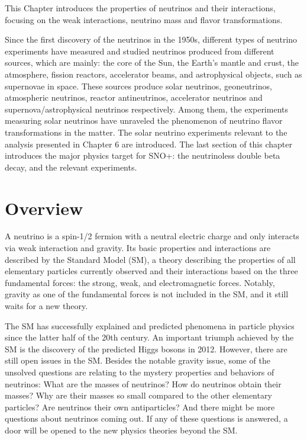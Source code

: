 This Chapter introduces the properties of neutrinos and their interactions, focusing on the weak interactions, neutrino mass and flavor transformations. 

Since the first discovery of the neutrinos in the 1950s, different types of neutrino experiments have measured and studied neutrinos produced from different sources, which are mainly: the core of the Sun, the Earth's mantle and crust, the atmosphere, fission reactors, accelerator beams, and astrophysical objects, such as supernovae in space. These sources produce solar neutrinos, geoneutrinos, atmospheric neutrinos, reactor antineutrinos, accelerator neutrinos and supernova/astrophysical neutrinos respectively. Among them, the experiments measuring solar neutrinos have unraveled the phenomenon of neutrino flavor transformations in the matter. The solar neutrino experiments relevant to the analysis presented in Chapter 6 are introduced. The last section of this chapter introduces the major physics target for SNO+: the neutrinoless double beta decay, and the relevant experiments.

\section{Overview}

A neutrino is a spin-1/2 fermion with a neutral electric charge and only interacts via weak interaction and gravity. Its basic properties and interactions are described by the Standard Model (SM), a theory describing the properties of all elementary particles currently observed and their interactions based on the three fundamental forces: the strong, weak, and electromagnetic forces. Notably, gravity as one of the fundamental forces is not included in the SM, and it still waits for a new theory. 

The SM has successfully explained and predicted phenomena in particle physics since the latter half of the 20th century. An important triumph achieved by the SM is the discovery of the predicted Higgs bosons in 2012. However, there are still open issues in the SM. Besides the notable gravity issue, some of the unsolved questions are relating to the mystery properties and behaviors of neutrinos: What are the masses of neutrinos? How do neutrinos obtain their masses? Why are their masses so small compared to the other elementary particles? Are neutrinos their own antiparticles? And there might be more questions about neutrinos coming out. If any of these questions is answered, a door will be opened to the new physics theories beyond the SM.

